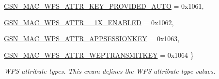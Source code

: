\begin{DoxyCompactItemize}
\par
\hyperlink{a00642_gga0ae19d69a0b381d883890df8a7812414ac27a96bcbf6bb6daaa59c46c000c8cb5}{GSN\_\-MAC\_\-WPS\_\-ATTR\_\-KEY\_\-PROVIDED\_\-AUTO} =  0x1061, 
\par
\hyperlink{a00642_gga0ae19d69a0b381d883890df8a7812414a2dcc37ccc4d028268022fb606db04ada}{GSN\_\-MAC\_\-WPS\_\-ATTR\_\_\-1X\_\-ENABLED} =  0x1062, 
\par
\hyperlink{a00642_gga0ae19d69a0b381d883890df8a7812414a83c9a15823fc1f9759c87d8f8c88746b}{GSN\_\-MAC\_\-WPS\_\-ATTR\_\-APPSESSIONKEY} =  0x1063, 
\par
\hyperlink{a00642_gga0ae19d69a0b381d883890df8a7812414a89a728e5656f62fe81a5263adcbdf6e0}{GSN\_\-MAC\_\-WPS\_\-ATTR\_\-WEPTRANSMITKEY} =  0x1064
 \}
\begin{DoxyCompactList}\small\item\em WPS attribute types. This enum defines the WPS attribute type values. \end{DoxyCompactList}\end{DoxyCompactItemize}
